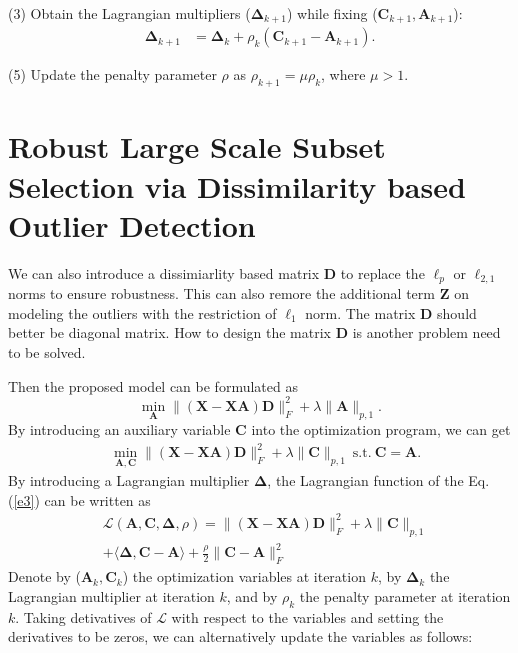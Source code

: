 \documentclass[10pt,twocolumn,letterpaper]{article}
\begin{document}
(3) Obtain the Lagrangian multipliers ($\bm{\Delta}_{k+1}$) while fixing ($\bm{C}_{k+1},\bm{A}_{k+1}$):
\begin{equation}
\begin{split}
\label{e10}
\bm{\Delta}_{k+1}
&
=
\bm{\Delta}_{k}
+
\rho_{k}
(\bm{C}_{k+1}-\bm{A}_{k+1})
.
\end{split}
\end{equation}

(5) Update the penalty parameter $\rho$ as $\rho_{k+1}=\mu\rho_{k}$, where $\mu>1$.


\section{Robust Large Scale Subset Selection via Dissimilarity based Outlier Detection}


We can also introduce a dissimiarlity based matrix $\bm{D}$ to replace the $\ell_{p}$ or $\ell_{2,1}$ norms to ensure robustness. This can also remore the additional term $\bm{Z}$ on modeling the outliers with the restriction of $\ell_{1}$ norm. The matrix $\bm{D}$ should better be diagonal matrix. How to design the matrix $\bm{D}$ is another problem need to be solved.

Then the proposed model can be formulated as  
\begin{equation}
\label{e2}
\min_{\bm{A}}
\|
(\bm{X}
-
\bm{X}\bm{A})
\bm{D}
\|_{F}^{2}
+
\lambda
\|
\bm{A}
\|_{p,1}
.
\end{equation}
By introducing an auxiliary variable $\bm{C}$ into the optimization program, we can get
\begin{equation}
\begin{split}
\label{e3}
&
\min_{\bm{A},\bm{C}}
\|
(\bm{X}
-
\bm{X}\bm{A})
\bm{D}
\|_{F}^{2}
+
\lambda
\|
\bm{C}
\|_{p,1}
\ 
\text{s.t.}
\ 
\bm{C}=\bm{A}
.
\end{split}
\end{equation}
By introducing a Lagrangian multiplier $\bm{\Delta}$, the Lagrangian function of the Eq. (\ref{e3}) can be written as
\begin{equation}
\begin{split}
\label{e5}
&
\mathcal{L}
(\bm{A},\bm{C},\bm{\Delta},\rho)
=
\|
(\bm{X}
-
\bm{X}\bm{A})
\bm{D}
\|_{F}^{2}
+
\lambda
\|
\bm{C}
\|_{p,1}
\\
&
+
\langle
\bm{\Delta},
\bm{C}-\bm{A}
\rangle
+
\frac{\rho}{2}
\|
\bm{C}
-
\bm{A}
\|_{F}^{2}
\end{split}
\end{equation}
Denote by ($\bm{A}_{k},\bm{C}_{k}$) the optimization variables at iteration $k$, by $\bm{\Delta}_{k}$ the Lagrangian multiplier at iteration $k$, and by $\rho_{k}$ the penalty parameter at iteration $k$. Taking detivatives of $\mathcal{L}$ with respect to the variables and setting the derivatives to be zeros, we can alternatively update the variables as follows:
\end{document}
